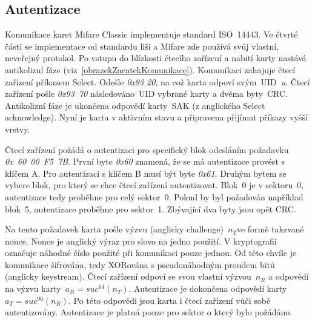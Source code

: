 \subsection{Autentizace}
\label{autentizace}
Komunikace karet Mifare Classic implementuje standard ISO~14443. Ve čtvrté části se implementace od standardu liší a Mifare zde používá svůj vlastní, neveřejný protokol. Po vstupu do blízkosti čtecího zařízení a nabití karty nastává antikolizní fáze (viz~\ref{obrazekZacatekKomunikace}). Komunikaci zahajuje čtecí zařízení příkazem Select. Odešle \emph{0x93 20}, na což karta odpoví svým~UID~\emph{u}. Čtecí zařízení pošle \emph{0x93~70} následováno~UID vybrané karty a dvěma byty~CRC. Antikolizní fáze je ukončena odpovědí karty~SAK (z anglického Select acknowledge). Nyní je karta v aktivním stavu a připravena přijímat příkazy vyšší vrstvy\cite{PracticalAttackOnMifare}.
\par
Čtecí zařízení požádá o autentizaci pro specifický blok odesláním požadavku \emph{0x~60~00~F5~7B}. První byte \emph{0x60} znamená, že se má autentizace provést s klíčem A. Pro autentizaci s klíčem B musí být byte \emph{0x61}. Druhým bytem se vybere blok, pro který se chce čtecí zařízení autentizovat. Blok~0 je v sektoru~0, autentizace tedy proběhne pro celý sektor~0. Pokud by byl požadován například blok~5, autentizace proběhne pro sektor~1. Zbývající dva byty jsou opět CRC\cite{PracticalAttackOnMifare}. 
\par
Na tento požadavek karta pošle výzvu (anglicky challenge)~${n_T}$\footnotemark ve formě takzvané nonce\cite{Wirelessly_Pickpocketing}. Nonce je anglický výraz pro slovo na jedno použití. V kryptografii označuje náhodné číslo použité při komunikaci pouze jednou\cite{Nonce_Based_Encryption}. Od této chvíle je komunikace šifrována, tedy XORována s pseudonáhodným proudem bitů (anglicky keystream). Čtecí zařízení odpoví se svou vlastní výzvou~${n_R}$ a odpovědí na výzvu karty~${a_R = suc^{64}(n_T)}$. Autentizace je dokončena odpovědí karty~${a_T = suc^{96}(n_R)}$. Po této odpovědi jsou karta i čtecí zařízení vůči sobě autentizovány. Autentizace je platná pouze pro sektor o který bylo požádáno\cite{Wirelessly_Pickpocketing}. 


